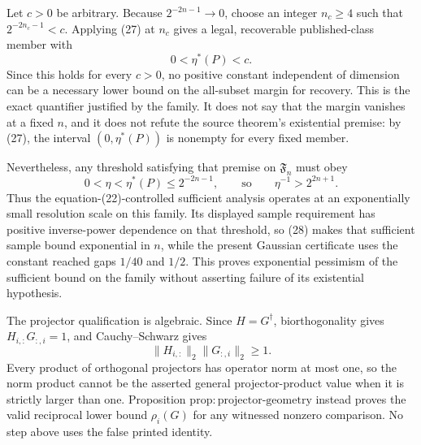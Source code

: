 Let \(c>0\) be arbitrary.  Because \(2^{-2n-1}\to0\), choose an integer \(n_c\ge4\) such that \(2^{-2n_c-1}<c\).  Applying (27) at \(n_c\) gives a legal, recoverable published-class member with
\[
 0<\eta^{\ast}(P)<c.
\]
Since this holds for every \(c>0\), no positive constant independent of dimension can be a necessary lower bound on the all-subset margin for recovery.  This is the exact quantifier justified by the family.  It does not say that the margin vanishes at a fixed \(n\), and it does not refute the source theorem's existential premise: by (27), the interval \((0,\eta^{\ast}(P))\) is nonempty for every fixed member.

Nevertheless, any threshold satisfying that premise on \(\mathfrak F_n\) must obey
\[
 0<\eta<\eta^{\ast}(P)\le2^{-2n-1},
 \qquad\text{so}\qquad
 \eta^{-1}>2^{2n+1}.
 \tag{28}
\]
Thus the equation-(22)-controlled sufficient analysis operates at an exponentially small resolution scale on this family.  Its displayed sample requirement has positive inverse-power dependence on that threshold, so (28) makes that sufficient sample bound exponential in \(n\), while the present Gaussian certificate uses the constant reached gaps \(1/40\) and \(1/2\).  This proves exponential pessimism of the sufficient bound on the family without asserting failure of its existential hypothesis.

The projector qualification is algebraic.  Since \(H=G^{\dagger}\), biorthogonality gives \(H_{i,:}G_{:,i}=1\), and Cauchy--Schwarz gives
\[
 \|H_{i,:}\|_2\|G_{:,i}\|_2\ge1.
\]
Every product of orthogonal projectors has operator norm at most one, so the norm product cannot be the asserted general projector-product value when it is strictly larger than one.  Proposition \(\mathrm{prop{:}projector\mbox{-}geometry}\) instead proves the valid reciprocal lower bound \(\rho_i(G)\) for any witnessed nonzero comparison.  No step above uses the false printed identity.
